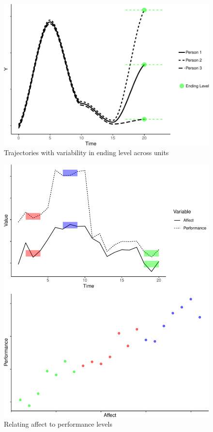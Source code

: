 \documentclass[english,,man]{apa6}
\theoremstyle{definition}
\theoremstyle{definition}
\theoremstyle{definition}
\theoremstyle{remark}
\begin{document}
\begin{figure}
\centering
\includegraphics{figures/unnamed-chunk-9-1.pdf}
\caption{\label{fig:unnamed-chunk-9}Trajectories with variability in ending
level across units\label{level_var}}
\end{figure}

\begin{figure}
\centering
\includegraphics{figures/unnamed-chunk-10-1.pdf}
\caption{\label{fig:unnamed-chunk-10}Relating affect to performance
levels\label{level_relation}}
\end{figure}
\end{document}
